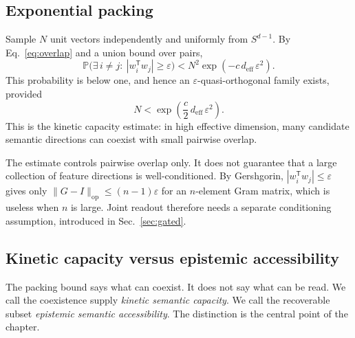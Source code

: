 \documentclass[
  aps,
  reprint,
  superscriptaddress,
  floatfix,
  nofootinbib,
  longbibliography
]{revtex4-2}
\newcommand{\Prob}{\mathbb{P}}
\newcommand{\Sph}[1]{S^{#1}}
\newcommand{\deff}{d_{\mathrm{eff}}}
\newcommand{\T}{^{\mathsf{T}}}
\newcommand{\opnorm}[1]{\lVert #1 \rVert_{\mathrm{op}}}
\begin{document}
\subsection{Exponential packing}
\label{sec:packing}

Sample $N$ unit vectors independently and uniformly from
$\Sph{d-1}$. By Eq.~\eqref{eq:overlap} and a union bound over pairs,
%
\begin{equation}
\label{eq:unionbound}
\Prob\bigl(\exists\,i\neq j:\ |w_i\T w_j|\ge\varepsilon\bigr)
 < N^{2}\exp(-c\,\deff\,\varepsilon^{2}).
\end{equation}
%
This probability is below one, and hence an
$\varepsilon$-quasi-orthogonal family exists, provided
%
\begin{equation}
\label{eq:packing}
N < \exp\!\left(\frac{c}{2}\,\deff\,\varepsilon^{2}\right).
\end{equation}
%
This is the kinetic capacity estimate: in high effective dimension,
many candidate semantic directions can coexist with small pairwise
overlap.

The estimate controls pairwise overlap only. It does not guarantee that
a large collection of feature directions is well-conditioned. By Gershgorin,
$|w_i\T w_j|\le\varepsilon$ gives only
$\opnorm{G-I}\le(n-1)\varepsilon$ for an $n$-element Gram matrix, which
is useless when $n$ is large. Joint readout therefore needs a
separate conditioning assumption, introduced in Sec.~\ref{sec:gated}.

\subsection{Kinetic capacity versus epistemic accessibility}
\label{sec:kinetic-epistemic}

The packing bound says what can coexist. It does not say what can be
read. We call the coexistence supply \emph{kinetic semantic capacity}.
We call the recoverable subset \emph{epistemic semantic accessibility}.
The distinction is the central point of the chapter.
\end{document}
